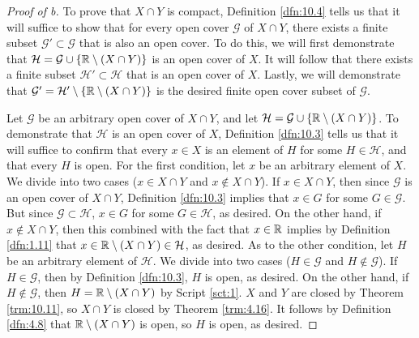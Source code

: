 \documentclass[../main.tex]{subfiles}
\begin{document}
\begin{enumerate}
\begin{proof}[Proof of b]
        To prove that $X\cap Y$ is compact, Definition \ref{dfn:10.4} tells us that it will suffice to show that for every open cover $\mathcal{G}$ of $X\cap Y$, there exists a finite subset $\mathcal{G}'\subset\mathcal{G}$ that is also an open cover. To do this, we will first demonstrate that $\mathcal{H}=\mathcal{G}\cup\{\mathbb{R}\setminus(X\cap Y)\}$ is an open cover of $X$. It will follow that there exists a finite subset $\mathcal{H}'\subset\mathcal{H}$ that is an open cover of $X$. Lastly, we will demonstrate that $\mathcal{G}'=\mathcal{H}'\setminus\{\mathbb{R}\setminus(X\cap Y)\}$ is the desired finite open cover subset of $\mathcal{G}$.\par
        Let $\mathcal{G}$ be an arbitrary open cover of $X\cap Y$, and let $\mathcal{H}=\mathcal{G}\cup\{\mathbb{R}\setminus(X\cap Y)\}$. To demonstrate that $\mathcal{H}$ is an open cover of $X$, Definition \ref{dfn:10.3} tells us that it will suffice to confirm that every $x\in X$ is an element of $H$ for some $H\in\mathcal{H}$, and that every $H$ is open. For the first condition, let $x$ be an arbitrary element of $X$. We divide into two cases ($x\in X\cap Y$ and $x\notin X\cap Y$). If $x\in X\cap Y$, then since $\mathcal{G}$ is an open cover of $X\cap Y$, Definition \ref{dfn:10.3} implies that $x\in G$ for some $G\in\mathcal{G}$. But since $\mathcal{G}\subset\mathcal{H}$, $x\in G$ for some $G\in\mathcal{H}$, as desired. On the other hand, if $x\notin X\cap Y$, then this combined with the fact that $x\in\mathbb{R}$ implies by Definition \ref{dfn:1.11} that $x\in\mathbb{R}\setminus(X\cap Y)\in\mathcal{H}$, as desired. As to the other condition, let $H$ be an arbitrary element of $\mathcal{H}$. We divide into two cases ($H\in\mathcal{G}$ and $H\notin\mathcal{G}$). If $H\in\mathcal{G}$, then by Definition \ref{dfn:10.3}, $H$ is open, as desired. On the other hand, if $H\notin\mathcal{G}$, then $H=\mathbb{R}\setminus(X\cap Y)$ by Script \ref{sct:1}. $X$ and $Y$ are closed by Theorem \ref{trm:10.11}, so $X\cap Y$ is closed by Theorem \ref{trm:4.16}. It follows by Definition \ref{dfn:4.8} that $\mathbb{R}\setminus(X\cap Y)$ is open, so $H$ is open, as desired.\par

\end{proof}
\end{enumerate}
\end{document}

